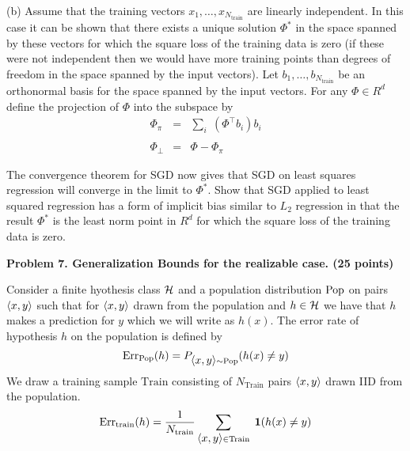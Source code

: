 
(b) Assume that the training vectors $x_1,\ldots,x_{N_{\mathrm{train}}}$ are linearly independent.  In this case it can be shown that there exists a unique solution $\Phi^*$ in the space
spanned by these vectors for which the square loss of the training data is zero (if these were not independent then we would have more training points than degrees of freedom
in the space spanned by the input vectors). Let $b_1,\ldots,b_{N_{\mathrm{train}}}$ be an orthonormal basis
for the space spanned by the input vectors. For any $\Phi \in R^d$ define the projection of $\Phi$ into the subspace by
\begin{eqnarray*}
  \Phi_\pi & = & \sum_i\;(\Phi^\top b_i)b_i \\
  \\
  \Phi_\bot & = & \Phi - \Phi_\pi
\end{eqnarray*}

The convergence theorem for SGD now gives that SGD on least squares regression will converge in the limit to $\Phi^*$.  Show that SGD applied to least
squared regression has a form of implicit bias similar to $L_2$ regression in that the result $\Phi^*$ is the least norm point in $R^d$ for which
the square loss of the training data is zero.



\bigskip
{\bf Problem 7. Generalization Bounds for the realizable case. (25 points)}

Consider a finite hyothesis class ${\cal H}$ and a population distribution $\mathrm{Pop}$ on pairs ${\mbox{$\langle x,y\rangle$}}$ such that for ${\mbox{$\langle x,y\rangle$}}$ drawn from the
population and $h \in {\cal H}$ we have that $h$ makes a prediction for $y$ which we will write as $h(x)$.  The error rate of hypothesis $h$ on the population is defined by
$$\mathrm{Err}_{\mathrm{Pop}}(h) = P_{{\mbox{$\langle x,y\rangle$}} \sim \mathrm{Pop}}(h(x) \not = y)$$
We draw a training sample $\mathrm{Train}$ consisting of $N_{\mathrm{Train}}$ pairs ${\mbox{$\langle x,y\rangle$}}$ drawn IID from the population.
$$\mathrm{Err}_{\mathrm{train}}(h) = \frac{1}{N_{\mathrm{train}}} \sum_{{\mbox{$\langle x,y\rangle$}} \in \mathrm{Train}}\;\mathbf{1}(h(x) \not = y)$$

